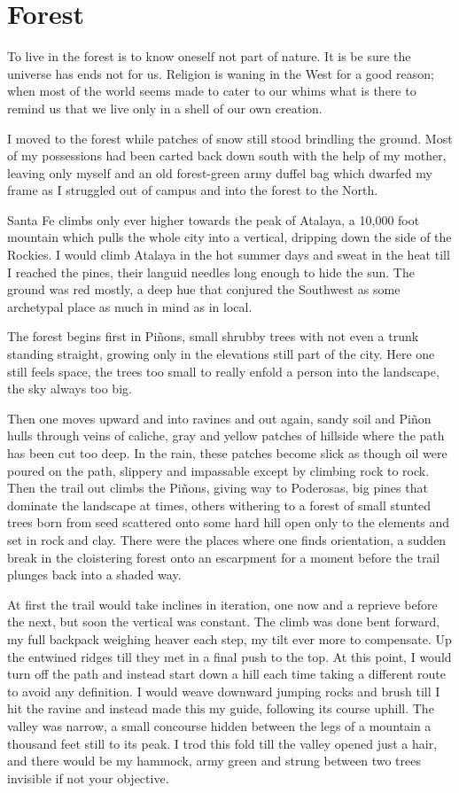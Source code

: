 \documentclass[ebook, 10pt, openright, onecolumn]{memoir}
\begin{document}
\chapter{Forest}
\label{cha:forest}

To live in the forest is to know oneself not part of nature.  It is be sure the
universe has ends not for us.  Religion is waning in the West for a good
reason; when most of the world seems made to cater to our whims what is there to
remind us that we live only in a shell of our own creation.

I moved to the forest while patches of snow still stood brindling the
ground. Most of my possessions had been carted back down south with the help of
my mother, leaving only myself and an old forest-green army duffel bag which
dwarfed my frame as I struggled out of campus and into the forest to the North.

Santa Fe climbs only ever higher towards the peak of Atalaya, a 10,000 foot
mountain which pulls the whole city into a vertical, dripping down the side of
the Rockies. I would climb Atalaya in the hot summer days and sweat in the heat
till I reached the pines, their languid needles long enough to hide the sun.
The ground was red mostly, a deep hue that conjured the Southwest as some
archetypal place as much in mind as in local.

The forest begins first in Piñons, small shrubby trees with not even a trunk
standing straight, growing only in the elevations still part of the city.  Here
one still feels space, the trees too small to really enfold a person into the
landscape, the sky always too big. 

Then one moves upward and into ravines and out again, sandy soil and Piñon hulls
through veins of caliche, gray and yellow patches of hillside where the path has
been cut too deep. In the rain, these patches become slick as though oil were
poured on the path, slippery and impassable except by climbing rock to rock.
Then the trail out climbs the Piñons, giving way to Poderosas, big pines that
dominate the landscape at times, others withering to a forest of small stunted
trees born from seed scattered onto some hard hill open only to the elements
and set in rock and clay.  There were the places where one finds orientation, a
sudden break in the cloistering forest onto an escarpment for a moment before the
trail plunges back into a shaded way.

At first the trail would take inclines in iteration, one now and a reprieve
before the next, but soon the vertical was constant.  The climb was done bent
forward, my full backpack weighing heaver each step, my tilt ever more to
compensate.  Up the entwined ridges till they met in a final push to the top.
At this point, I would turn off the path and instead start down a hill each time
taking a different route to avoid any definition. I would weave downward jumping
rocks and brush till I hit the ravine and instead made this my guide, following
its course uphill.  The valley was narrow, a small concourse hidden between the
legs of a mountain a thousand feet still to its peak.  I trod this fold till the
valley opened just a hair, and there would be my hammock, army green and strung
between two trees invisible if not your objective.
\end{document}
